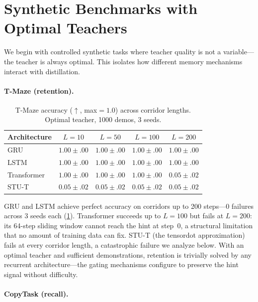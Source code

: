 \section{Synthetic Benchmarks with Optimal Teachers}
\label{sec:synthetic}

We begin with controlled synthetic tasks where teacher quality is not a variable---the teacher is always optimal.
This isolates how different memory mechanisms interact with distillation.

\paragraph{T-Maze (retention).}

\begin{table}[ht]
\centering
\caption{T-Maze accuracy ($\uparrow$, max${=}1.0$) across corridor lengths. Optimal teacher, 1000 demos, 3 seeds.}
\label{tab:tmaze}
\begin{tabular}{lcccc}
\toprule
Architecture & $L=10$ & $L=50$ & $L=100$ & $L=200$ \\
\midrule
GRU            & $1.00 \pm .00$ & $1.00 \pm .00$ & $1.00 \pm .00$ & $\mathbf{1.00 \pm .00}$ \\
LSTM           & $1.00 \pm .00$ & $1.00 \pm .00$ & $1.00 \pm .00$ & $\mathbf{1.00 \pm .00}$ \\
Transformer    & $1.00 \pm .00$ & $1.00 \pm .00$ & $1.00 \pm .00$ & $0.05 \pm .02$ \\
STU-T          & $0.05 \pm .02$ & $0.05 \pm .02$ & $0.05 \pm .02$ & $0.05 \pm .02$ \\
\bottomrule
\end{tabular}
\end{table}

GRU and LSTM achieve perfect accuracy on corridors up to 200 steps---0 failures across 3 seeds each (\cref{tab:tmaze}).
Transformer succeeds up to $L{=}100$ but fails at $L{=}200$: its 64-step sliding window cannot reach the hint at step~0, a structural limitation that no amount of training data can fix.
STU-T (the tensordot approximation) fails at every corridor length, a catastrophic failure we analyze below.
With an optimal teacher and sufficient demonstrations, retention is trivially solved by any recurrent architecture---the gating mechanisms configure to preserve the hint signal without difficulty.

\paragraph{CopyTask (recall).}

